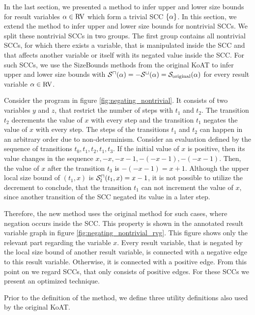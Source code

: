 In the last section, we presented a method to infer upper and lower size bounds for result variables $\alpha \in \text{RV}$ which form a trivial SCC $\lbrace \alpha \rbrace$.
In this section, we extend the method to infer upper and lower size bounds for nontrivial SCCs.
We split these nontrivial SCCs in two groups.
The first group contains all nontrivial SCCs, for which there exists a variable, that is manipulated inside the SCC and that affects another variable or itself with its negated value inside the SCC.
For such SCCs, we use the SizeBounds methods from the original KoAT to infer upper and lower size bounds with ${\mathcal{S}^\sqcap}(\alpha) = -{\mathcal{S}^\sqcup}(\alpha) = \mathcal{S}_{\text{original}}(\alpha)$ for every result variable $\alpha \in \text{RV}$.



Consider the program in figure \ref{fig:negating_nontrivial}.
It consists of two variables $y$ and $z$, that restrict the number of steps with $t_1$ and $t_2$.
The transition $t_2$ decrements the value of $x$ with every step and the transition $t_1$ negates the value of $x$ with every step.
The steps of the transitions $t_1$ and $t_2$ can happen in an arbitrary order due to non-determinism.
Consider an evaluation defined by the sequence of transitions $t_0, t_1, t_2, t_1, t_3$.
If the initial value of $x$ is positive, then its value changes in the sequence $x, -x, -x-1, -(-x-1), -(-x-1)$.
Then, the value of $x$ after the transition $t_3$ is $-(-x-1) = x+1$.
Although the upper local size bound of $(t_1,x)$ is ${\mathcal{S}^\sqcap_l}(t_1,x) = x-1$, it is not possible to utilize the decrement to conclude, that the transition $t_1$ can not increment the value of $x$, since another transition of the SCC negated its value in a later step.



Therefore, the new method uses the original method for such cases, where negation occurs inside the SCC.
This property is shown in the annotated result variable graph in figure \ref{fig:negating_nontrivial_rvg}.
This figure shows only the relevant part regarding the variable $x$.
Every result variable, that is negated by the local size bound of another result variable, is connected with a negative edge to this result variable.
Otherwise, it is connected with a positive edge.
From this point on we regard SCCs, that only consists of positive edges.
For these SCCs we present an optimized technique.

Prior to the definition of the method, we define three utility definitions also used by the original KoAT.

